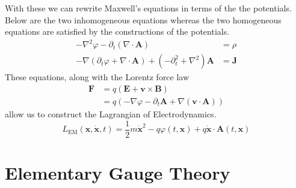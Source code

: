 With these we can rewrite Maxwell's equations in terms of the the potentials. Below are the two inhomogeneous equations whereas the two homogeneous equations are satisfied by the constructions of the potentials.
\begin{align}
-\nabla ^{2}\varphi - \partial_t (\nabla \cdot \mathbf{A}) & = \rho \label{eq:maxPot1} \\
-\nabla(\partial_t\varphi + \nabla\cdot\mathbf{A}) + (-\partial_t^2 + \nabla^2)\mathbf{A} & = \mathbf{J} \label{eq:maxPot2}
\end{align}
These equations, along with the Lorentz force law
\begin{align}\label{eq:lorentz}
\mathbf{F} & = q\left(\mathbf{E} + \mathbf{v}\times\mathbf{B}\right) \nonumber\\
 & = q\left(-\nabla\varphi - \partial_t\mathbf{A} + \nabla(\mathbf{v}\cdot\mathbf{A})\right)
\end{align}
allow us to construct the Lagrangian of Electrodynamics.
\begin{equation}\label{eq:lagEM}
L_\text{EM}(\mathbf{x}, \dot{\mathbf{x}},t) = \frac{1}{2}m\dot{\mathbf{x}}^2 - q\varphi(t,\mathbf{x}) + q\dot{\mathbf{x}}\cdot\mathbf{A}(t,\mathbf{x})
\end{equation}


\section{Elementary Gauge Theory}

